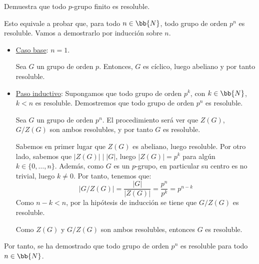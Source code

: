 \begin{ejercicio}\label{ej:5.14}
    Demuestra que todo $p$-grupo finito es resoluble.


    Esto equivale a probar que, para todo $n\in\bb{N}$, todo grupo de orden $p^n$ es resoluble. Vamos a demostrarlo por inducción sobre $n$.
    \begin{itemize}
        \item \ul{Caso base}: $n=1$.
        
        Sea $G$ un grupo de orden $p$. Entonces, $G$ es cíclico, luego abeliano y por tanto resoluble.

        \item \ul{Paso inductivo}: Supongamos que todo grupo de orden $p^k$, con $k\in \bb{N}$, $k<n$ es resoluble. Demostremos que todo grupo de orden $p^{n}$ es resoluble.
        
        Sea $G$ un grupo de orden $p^{n}$. El procedimiento será ver que $Z(G)$, $G/Z(G)$ son ambos resolubles, y por tanto $G$ es resoluble.
        

        Sabemos en primer lugar que $Z(G)$ es abeliano, luego resoluble. Por otro lado, sabemos que $|Z(G)|\mid |G|$, luego $|Z(G)|=p^k$ para algún $k\in\{0,\ldots,n\}$.
        Además, como $G$ es un $p$-grupo, en particular su centro es no trivial, luego $k\neq 0$.
        Por tanto, tenemos que:
        \begin{equation*}
            \left|G/Z(G)\right| = \dfrac{|G|}{|Z(G)|} = \dfrac{p^{n}}{p^k} = p^{n-k}
        \end{equation*}
        Como $n-k<n$, por la hipótesis de inducción se tiene que $G/Z(G)$ es resoluble.

        Como $Z(G)$ y $G/Z(G)$ son ambos resolubles, entonces $G$ es resoluble.
    \end{itemize}

    Por tanto, se ha demostrado que todo grupo de orden $p^n$ es resoluble para todo $n\in\bb{N}$.
\end{ejercicio}


